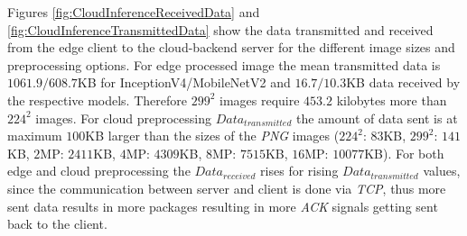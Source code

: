 Figures \ref{fig:CloudInferenceReceivedData} and \ref{fig:CloudInferenceTransmittedData} show the data transmitted and received from the edge client to the cloud-backend server for the different image sizes and preprocessing options.
For edge processed image the mean transmitted data is $1061.9/608.7$KB for InceptionV4/MobileNetV2 and $16.7/10.3$KB data received by the respective models.
Therefore $299^2$ images require $453.2$ kilobytes more than $224^2$ images.
For cloud preprocessing $Data_{transmitted}$ the amount of data sent is at maximum $100$KB larger than the sizes of the \emph{PNG} images ($224^2$: $83$KB, $299^2$: $141$KB, $2$MP: $2411$KB, $4$MP: $4309$KB, $8$MP: $7515$KB,  $16$MP: $10077$KB).
For both edge and cloud preprocessing the $Data_{received}$ rises for rising $Data_{transmitted}$ values, since the communication between server and client is done via \emph{TCP}, thus more sent data results in more packages resulting in more \emph{ACK} signals getting sent back to the client.



\FloatBarrier
